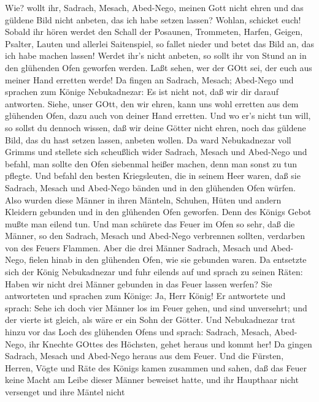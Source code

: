 Wie? wollt ihr, Sadrach, Mesach, Abed-Nego, meinen Gott nicht ehren und
das güldene Bild nicht anbeten, das ich habe setzen lassen?
 Wohlan, schicket euch! Sobald ihr hören werdet den Schall
der Posaunen, Trommeten, Harfen, Geigen, Psalter, Lauten und allerlei
Saitenspiel, so fallet nieder und betet das Bild an, das ich habe machen
lassen! Werdet ihr's nicht anbeten, so sollt ihr von Stund an in den
glühenden Ofen geworfen werden. Laßt sehen, wer der GOtt sei, der euch
aus meiner Hand erretten werde!  Da fingen an Sadrach,
Mesach; Abed-Nego und sprachen zum Könige Nebukadnezar: Es ist nicht
not, daß wir dir darauf antworten.  Siehe, unser GOtt, den
wir ehren, kann uns wohl erretten aus dem glühenden Ofen, dazu auch von
deiner Hand erretten.  Und wo er's nicht tun will, so
sollst du dennoch wissen, daß wir deine Götter nicht ehren, noch das
güldene Bild, das du hast setzen lassen, anbeten wollen. 
Da ward Nebukadnezar voll Grimms und stellete sich scheußlich wider
Sadrach, Mesach und Abed-Nego und befahl, man sollte den Ofen siebenmal
heißer machen, denn man sonst zu tun pflegte.  Und befahl
den besten Kriegsleuten, die in seinem Heer waren, daß sie Sadrach,
Mesach und Abed-Nego bänden und in den glühenden Ofen würfen.
 Also wurden diese Männer in ihren Mänteln, Schuhen, Hüten
und andern Kleidern gebunden und in den glühenden Ofen geworfen.
 Denn des Königs Gebot mußte man eilend tun. Und man
schürete das Feuer im Ofen so sehr, daß die Männer, so den Sadrach,
Mesach und Abed-Nego verbrennen sollten, verdarben von des Feuers
Flammen.  Aber die drei Männer Sadrach, Mesach und
Abed-Nego, fielen hinab in den glühenden Ofen, wie sie gebunden waren.
 Da entsetzte sich der König Nebukadnezar und fuhr eilends
auf und sprach zu seinen Räten: Haben wir nicht drei Männer gebunden in
das Feuer lassen werfen? Sie antworteten und sprachen zum Könige: Ja,
Herr König!  Er antwortete und sprach: Sehe ich doch vier
Männer los im Feuer gehen, und sind unversehrt; und der vierte ist
gleich, als wäre er ein Sohn der Götter.  Und Nebukadnezar
trat hinzu vor das Loch des glühenden Ofens und sprach: Sadrach, Mesach,
Abed-Nego, ihr Knechte GOttes des Höchsten, gehet heraus und kommt her!
Da gingen Sadrach, Mesach und Abed-Nego heraus aus dem Feuer.
 Und die Fürsten, Herren, Vögte und Räte des Königs kamen
zusammen und sahen, daß das Feuer keine Macht am Leibe dieser Männer
beweiset hatte, und ihr Haupthaar nicht versenget und ihre Mäntel nicht
